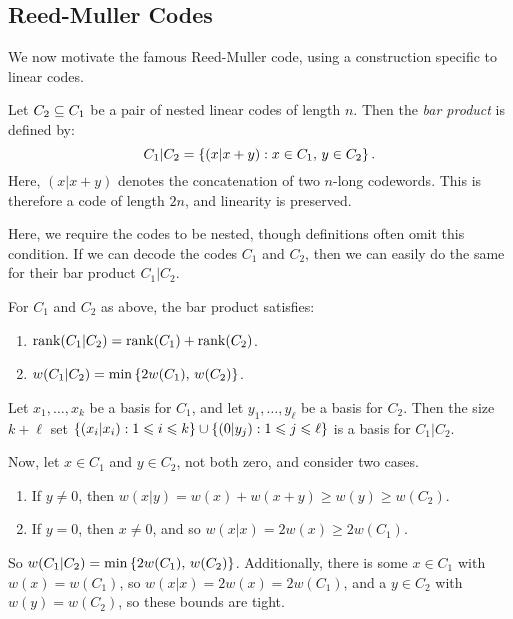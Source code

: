 \documentclass{article}
\begin{document}
\subsection{Reed-Muller Codes}
\label{subsection-reed-muller-code}

We now motivate the famous Reed-Muller code, using  a construction specific to linear codes.

\begin{definition}
	\label{bar-product-definition}
    Let $C_2 \subseteq C_1$ be a pair of nested linear codes of length $n$. Then the \textit{bar product} is defined by:
    \[
	C_1|C_2 = \left\lbrace (x|x+y) : x \in C_1, \, y \in C_2 \right\rbrace.
	\]
	Here, $(x|x+y)$ denotes the concatenation of two $n$-long codewords. This is therefore a code of length $2n$, and linearity is preserved.
\end{definition}

\begin{note}
	Here, we require the codes to be nested, though definitions often omit this condition. If we can decode the codes $C_1$ and $C_2$, then we can easily do the same for their bar product $C_1|C_2$.
\end{note}

\begin{proposition}
	\label{bar-product-properties}
    For $C_1$ and $C_2$ as above, the bar product satisfies:
    \begin{enumerate}
	    \item $\operatorname{rank}(C_1|C_2) = \operatorname{rank}(C_1) + \operatorname{rank}(C_2)$.
	    \item $w(C_1|C_2) = \min \left\lbrace 2w(C_1), \, w(C_2) \right\rbrace$.
	\end{enumerate}
\end{proposition}

\begin{prf}
    Let $x_1, \dots, x_k$ be a basis for $C_1$, and 
    let $y_1, \dots, y_\ell$ be a basis for $C_2$.
    Then the size $k+\ell$ set
    $\left\lbrace (x_i|x_i) : 1 \leqslant i \leqslant k \right\rbrace \cup \left\lbrace (0|y_j) : 1 \leqslant j \leqslant \ell \right\rbrace$
	is a basis for $C_1|C_2$.
	
	Now, let $x \in C_1$ and $y \in C_2$, not both zero, and consider two cases.
	\begin{enumerate}
    	\item If $y \neq 0$, then $w(x|y) = w(x) + w(x+y) \geq w(y) \geq w(C_2)$.
    	\item If $y = 0$, then $x \neq 0$, and so $w(x|x) = 2w(x) \geq 2w(C_1)$.
	\end{enumerate}
	So $w(C_1|C_2) = \min \left\lbrace 2w(C_1), \, w(C_2) \right\rbrace$. Additionally, there is some $x \in C_1$ with $w(x) = w(C_1)$, so $w(x|x) = 2w(x) = 2w(C_1)$, and a $y \in C_2$ with $w(y) = w(C_2)$, so these bounds are tight.
\end{prf}
\end{document}

